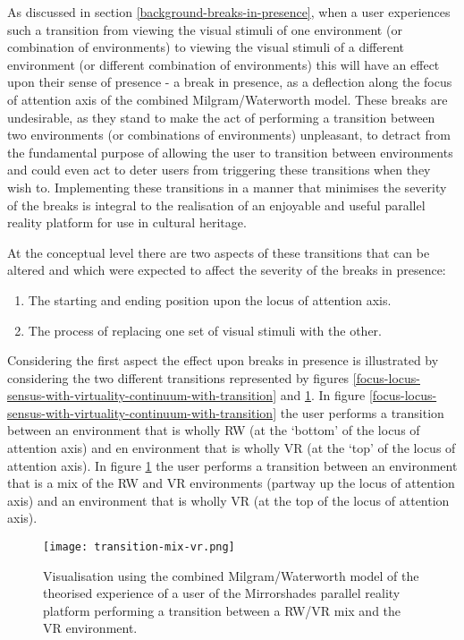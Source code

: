 As discussed in section \ref{background-breaks-in-presence}, when a user experiences such a transition from viewing the visual stimuli of one environment (or combination of environments) to viewing the visual stimuli of a different environment (or different combination of environments) this will have an effect upon their sense of presence - a break in presence, as a deflection along the focus of attention axis of the combined Milgram/Waterworth model. These breaks are undesirable, as they stand to make the act of performing a transition between two environments (or combinations of environments) unpleasant, to detract from the fundamental purpose of allowing the user to transition between environments and could even act to deter users from triggering these transitions when they wish to. Implementing these transitions in a manner that minimises the severity of the breaks is integral to the realisation of an enjoyable and useful parallel reality platform for use in cultural heritage.

At the conceptual level there are two aspects of these transitions that can be altered and which were expected to affect the severity of the breaks in presence:

\begin{enumerate}
	\item The starting and ending position upon the locus of attention axis.
	\item The process of replacing one set of visual stimuli with the other.
\end{enumerate}

Considering the first aspect the effect upon breaks in presence is illustrated by considering the two different transitions represented by figures \ref{focus-locus-sensus-with-virtuality-continuum-with-transition} and \ref{transition-mix-vr.png}. In figure \ref{focus-locus-sensus-with-virtuality-continuum-with-transition} the user performs a transition between an environment that is wholly RW (at the `bottom' of the locus of attention axis) and en environment that is wholly VR (at the `top' of the locus of attention axis). In figure \ref{transition-mix-vr.png} the user performs a transition between an environment that is a mix of the RW and VR environments (partway up the locus of attention axis) and an environment that is wholly VR (at the top of the locus of attention axis).

\begin{figure}[h]
	\begin{center}
		\texttt{[image: transition-mix-vr.png]}
		\caption{Visualisation using the combined Milgram/Waterworth model of the theorised experience of a user of the Mirrorshades parallel reality platform performing a transition between a RW/VR mix and the VR environment.}
		\label{transition-mix-vr.png}
	\end{center}
\end{figure}

